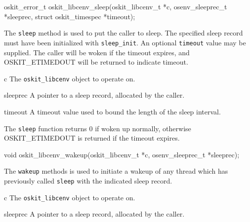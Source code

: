 \begin{apisyn}

	\funcproto oskit_error_t
		   oskit_libcenv_sleep(oskit_libcenv_t *c,
				osenv_sleeprec_t *sleeprec,
				struct oskit_timespec *timeout);
\end{apisyn}
\begin{apidesc}
	The \texttt{sleep} method is used to put the caller to sleep.
	The specified sleep record must have been initialized with
	\texttt{sleep_init}.
	An optional \texttt{timeout} value may be supplied. The
	caller will be woken if the timeout expires, and OSKIT_ETIMEDOUT
	will be returned to indicate timeout.
\end{apidesc}
\begin{apiparm}
	\item[c]
		The \texttt{oskit_libcenv} object to operate on.
	\item[sleeprec]
		A pointer to a sleep record, allocated by the caller.
	\item[timeout]
		A timeout value used to bound the length of the sleep
		interval. 
\end{apiparm}
\begin{apiret}
	The \texttt{sleep} function returns 0 if woken up normally,
	otherwise OSKIT_ETIMEDOUT is returned if the timeout expires.
\end{apiret}


\begin{apisyn}

	\funcproto void
		   oskit_libcenv_wakeup(oskit_libcenv_t *c,
				osenv_sleeprec_t *sleeprec);
\end{apisyn}
\begin{apidesc}
	The \texttt{wakeup} methods is used to initiate a wakeup
	of any thread which has previously called \texttt{sleep}
	with the indicated sleep record.
\end{apidesc}
\begin{apiparm}
	\item[c]
		The \texttt{oskit_libcenv} object to operate on.
	\item[sleeprec]
		A pointer to a sleep record, allocated by the caller.
\end{apiparm}


